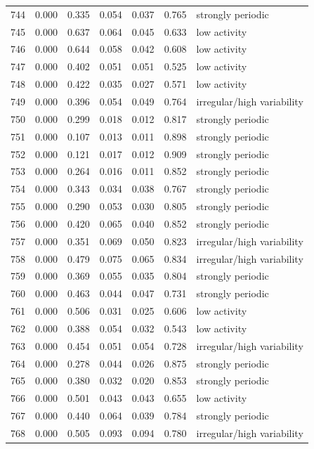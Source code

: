 \begin{longtable}{lrrrrrl}
744 & 0.000 & 0.335 & 0.054 & 0.037 & 0.765 & strongly periodic \\
745 & 0.000 & 0.637 & 0.064 & 0.045 & 0.633 & low activity \\
746 & 0.000 & 0.644 & 0.058 & 0.042 & 0.608 & low activity \\
747 & 0.000 & 0.402 & 0.051 & 0.051 & 0.525 & low activity \\
748 & 0.000 & 0.422 & 0.035 & 0.027 & 0.571 & low activity \\
749 & 0.000 & 0.396 & 0.054 & 0.049 & 0.764 & irregular/high variability \\
750 & 0.000 & 0.299 & 0.018 & 0.012 & 0.817 & strongly periodic \\
751 & 0.000 & 0.107 & 0.013 & 0.011 & 0.898 & strongly periodic \\
752 & 0.000 & 0.121 & 0.017 & 0.012 & 0.909 & strongly periodic \\
753 & 0.000 & 0.264 & 0.016 & 0.011 & 0.852 & strongly periodic \\
754 & 0.000 & 0.343 & 0.034 & 0.038 & 0.767 & strongly periodic \\
755 & 0.000 & 0.290 & 0.053 & 0.030 & 0.805 & strongly periodic \\
756 & 0.000 & 0.420 & 0.065 & 0.040 & 0.852 & strongly periodic \\
757 & 0.000 & 0.351 & 0.069 & 0.050 & 0.823 & irregular/high variability \\
758 & 0.000 & 0.479 & 0.075 & 0.065 & 0.834 & irregular/high variability \\
759 & 0.000 & 0.369 & 0.055 & 0.035 & 0.804 & strongly periodic \\
760 & 0.000 & 0.463 & 0.044 & 0.047 & 0.731 & strongly periodic \\
761 & 0.000 & 0.506 & 0.031 & 0.025 & 0.606 & low activity \\
762 & 0.000 & 0.388 & 0.054 & 0.032 & 0.543 & low activity \\
763 & 0.000 & 0.454 & 0.051 & 0.054 & 0.728 & irregular/high variability \\
764 & 0.000 & 0.278 & 0.044 & 0.026 & 0.875 & strongly periodic \\
765 & 0.000 & 0.380 & 0.032 & 0.020 & 0.853 & strongly periodic \\
766 & 0.000 & 0.501 & 0.043 & 0.043 & 0.655 & low activity \\
767 & 0.000 & 0.440 & 0.064 & 0.039 & 0.784 & strongly periodic \\
768 & 0.000 & 0.505 & 0.093 & 0.094 & 0.780 & irregular/high variability \\

\end{longtable}
